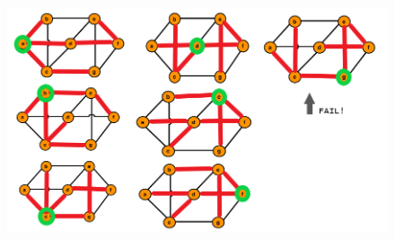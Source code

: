 \documentclass{article}
\begin{document}
\begin{enumerate}
\begin{figure}[h!]
\begin{center}
        \end{center}
        \end{figure}
        \begin{figure}[h!]
        \begin{center}
        \includegraphics[scale=0.5]{Dijkstras.png} 
        \end{center}
        \end{figure}
        \par
    \pagebreak


\end{enumerate}
\end{document}
